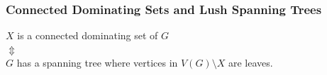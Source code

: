 \documentclass{beamer}
\begin{document}
\begin{frame}
  \frametitle{Connected Dominating Sets and Lush Spanning Trees}

  \begin{center}
    $X$ is a connected dominating set of $G$ \\[1em]
    $\Updownarrow$ \\[1em]
    $G$ has a spanning tree where vertices in $V(G)\setminus X$ are leaves.

\end{center}
\end{frame}
\end{document}
